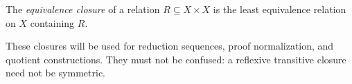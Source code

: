 \begin{definition}
The \emph{equivalence closure} of a relation \(R\subseteq X\times X\) is the
least equivalence relation on \(X\) containing \(R\).
\end{definition}

These closures will be used for reduction sequences, proof normalization, and
quotient constructions.  They must not be confused: a reflexive transitive
closure need not be symmetric.

